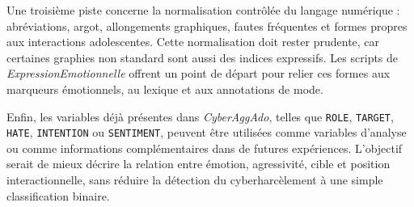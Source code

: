 Une troisième piste concerne la normalisation contrôlée du langage numérique : abréviations, argot, allongements graphiques, fautes fréquentes et formes propres aux interactions adolescentes. Cette normalisation doit rester prudente, car certaines graphies non standard sont aussi des indices expressifs. Les scripts de \textit{ExpressionEmotionnelle} offrent un point de départ pour relier ces formes aux marqueurs émotionnels, au lexique et aux annotations de mode.

Enfin, les variables déjà présentes dans \textit{CyberAggAdo}, telles que \texttt{ROLE}, \texttt{TARGET}, \texttt{HATE}, \texttt{INTENTION} ou \texttt{SENTIMENT}, peuvent être utilisées comme variables d'analyse ou comme informations complémentaires dans de futures expériences. L'objectif serait de mieux décrire la relation entre émotion, agressivité, cible et position interactionnelle, sans réduire la détection du cyberharcèlement à une simple classification binaire.





